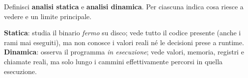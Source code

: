 \question[5]
Definisci \textbf{analisi statica} e \textbf{analisi dinamica}. Per ciascuna indica cosa riesce a vedere e un limite principale.
\begin{solution}
\textbf{Statica}: studia il binario \emph{fermo} su disco; vede tutto il codice presente (anche i rami mai eseguiti), ma non conosce i valori reali né le decisioni prese a runtime.
\textbf{Dinamica}: osserva il programma \emph{in esecuzione}; vede valori, memoria, registri e chiamate reali, ma solo lungo i cammini effettivamente percorsi in quella esecuzione.
\end{solution}

